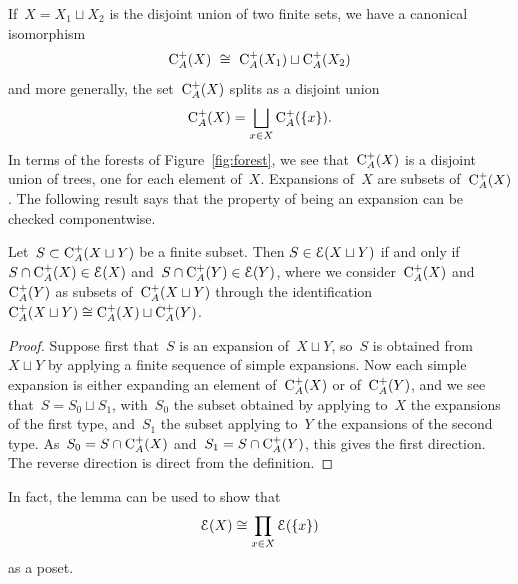 If~$X=X_1\sqcup X_2$ is the disjoint union of two finite sets, we have a canonical isomorphism
$$\rmC_A^+(X) \ \cong\ \rmC_A^+(X_1)\sqcup \rmC_A^+(X_2)$$
and more generally, the set~$\mathrm{C}_A^+(X)$ splits as a disjoint union
$$\mathrm{C}_A^+(X)=\bigsqcup_{x\in X}\mathrm{C}_A^+(\{x\}).$$
In terms of the forests of Figure~\ref{fig:forest}, we see that~$\mathrm{C}_A^+(X)$ is a disjoint union of trees, one for each element of~$X$. 
Expansions of~$X$ are subsets of~$\mathrm{C}_A^+(X)$. The following result says that the property of being an expansion can be checked componentwise.  


\begin{lem}\label{lem:exp} Let~$S\subset \mathrm{C}_{A}^+(X\sqcup Y)$ be a finite subset. Then 
$S\in \mathcal{E}(X\sqcup Y)$ if and only if~$S\cap \mathrm{C}_A^+(X)\in \mathcal{E}(X)$ and~\hbox{$S\cap \mathrm{C}_{A}^+(Y)\in \mathcal{E}(Y)$}, where we consider~$\mathrm{C}_A^+(X)$ and~$\mathrm{C}_A^+(Y)$ as subsets of~$\mathrm{C}_A^+(X\sqcup Y)$ through
 the identification~$\mathrm{C}_A^+(X\sqcup Y)\cong \mathrm{C}_A^+(X)\sqcup \mathrm{C}_A^+(Y)$. 
\end{lem}

\begin{proof}
Suppose first that~$S$ is an expansion of~$X\sqcup Y$, so~$S$ is obtained from~$X\sqcup Y$ by applying a finite sequence of simple expansions. Now each simple expansion is either expanding an element of~$\mathrm{C}_A^+(X)$ or of~$\mathrm{C}_A^+(Y)$, and we see that~$S=S_0\sqcup S_1$, with~$S_0$ the subset obtained by applying to~$X$ the expansions of the first type, and~$S_1$ the subset applying to~$Y$ the expansions of the second type. As~$S_0=S\cap \mathrm{C}_A^+(X)$ and~$S_1=S\cap \mathrm{C}_A^+(Y)$, this gives the first direction. The reverse direction is direct from the definition. 
\end{proof}


In fact, the lemma can be used to show that 
$$\mathcal{E}(X)\cong \prod_{x\in X}\mathcal{E}(\{x\})$$
as a poset. 

